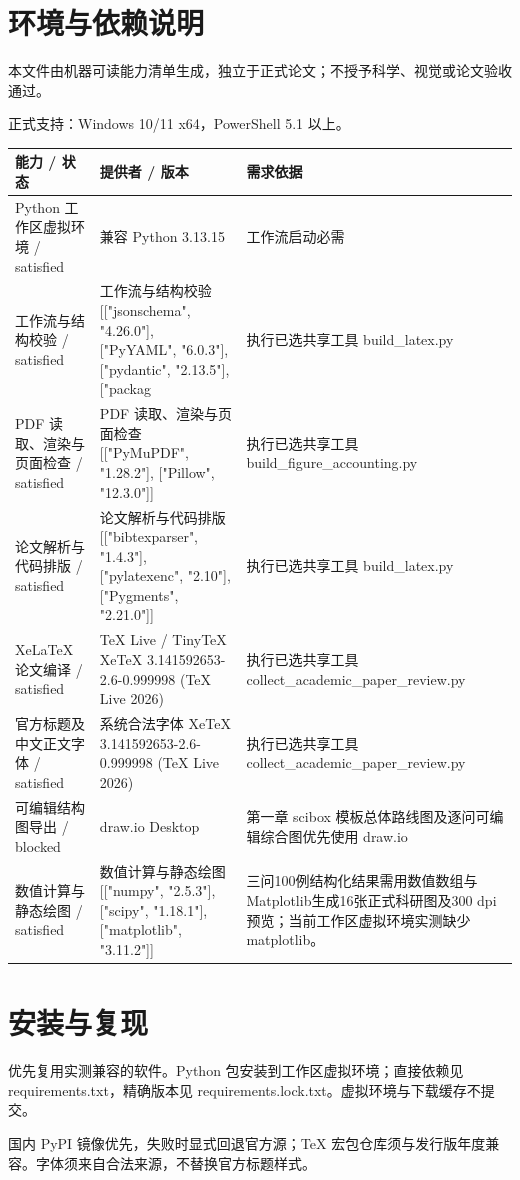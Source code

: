 \documentclass[UTF8,a4paper,10pt]{ctexart}
\begin{document}
\section*{环境与依赖说明}
本文件由机器可读能力清单生成，独立于正式论文；不授予科学、视觉或论文验收通过。
\par 正式支持：Windows 10/11 x64，PowerShell 5.1 以上。
\small
\begin{longtable}{>{\raggedright\arraybackslash}p{.19\linewidth}>{\raggedright\arraybackslash}p{.27\linewidth}>{\raggedright\arraybackslash}p{.43\linewidth}}
\toprule 能力 / 状态 & 提供者 / 版本 & 需求依据 \\ \midrule\endhead
Python 工作区虚拟环境 / satisfied & 兼容 Python 3.13.15 & 工作流启动必需 \\
工作流与结构校验 / satisfied & 工作流与结构校验 [["jsonschema", "4.26.0"], ["PyYAML", "6.0.3"], ["pydantic", "2.13.5"], ["packag & 执行已选共享工具 build\_latex.py \\
PDF 读取、渲染与页面检查 / satisfied & PDF 读取、渲染与页面检查 [["PyMuPDF", "1.28.2"], ["Pillow", "12.3.0"]] & 执行已选共享工具 build\_figure\_accounting.py \\
论文解析与代码排版 / satisfied & 论文解析与代码排版 [["bibtexparser", "1.4.3"], ["pylatexenc", "2.10"], ["Pygments", "2.21.0"]] & 执行已选共享工具 build\_latex.py \\
XeLaTeX 论文编译 / satisfied & TeX Live / TinyTeX XeTeX 3.141592653-2.6-0.999998 (TeX Live 2026) & 执行已选共享工具 collect\_academic\_paper\_review.py \\
官方标题及中文正文字体 / satisfied & 系统合法字体 XeTeX 3.141592653-2.6-0.999998 (TeX Live 2026) & 执行已选共享工具 collect\_academic\_paper\_review.py \\
可编辑结构图导出 / blocked & draw.io Desktop  & 第一章 scibox 模板总体路线图及逐问可编辑综合图优先使用 draw.io \\
数值计算与静态绘图 / satisfied & 数值计算与静态绘图 [["numpy", "2.5.3"], ["scipy", "1.18.1"], ["matplotlib", "3.11.2"]] & 三问100例结构化结果需用数值数组与Matplotlib生成16张正式科研图及300 dpi预览；当前工作区虚拟环境实测缺少matplotlib。 \\
\bottomrule\end{longtable}
\normalsize\section*{安装与复现}
优先复用实测兼容的软件。Python 包安装到工作区虚拟环境；直接依赖见 requirements.txt，精确版本见 requirements.lock.txt。虚拟环境与下载缓存不提交。
\par 国内 PyPI 镜像优先，失败时显式回退官方源；TeX 宏包仓库须与发行版年度兼容。字体须来自合法来源，不替换官方标题样式。
\end{document}
